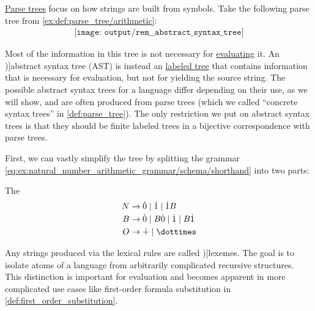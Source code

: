 \begin{concept}\label{con:abstract_syntax_tree}
  \hyperref[def:parse_tree]{Parse trees} focus on how strings are built from symbols. Take the following parse tree from \cref{ex:def:parse_tree/arithmetic}:
  \begin{equation}\label{eq:con:abstract_syntax_tree/base}
    \begin{aligned}
      \texttt{[image: output/rem\_\_abstract\_syntax\_tree]}
    \end{aligned}
  \end{equation}

  Most of the information in this tree is not necessary for \hyperref[con:evaluation]{evaluating} it. An \term[en=abstract syntax tree (\cite[41]{AhoEtAl2006Compilers})]{abstract syntax tree} (AST) is instead an \hyperref[def:labeled_tree]{labeled tree} that contains information that is necessary for evaluation, but not for yielding the source string. The possible abstract syntax trees for a language differ depending on their use, as we will show, and are often produced from parse trees (which we called \enquote{concrete syntax trees} in \cref{def:parse_tree}). The only restriction we put on abstract syntax trees is that they should be finite labeled trees in a bijective correspondence with parse trees.

  First, we can vastly simplify the tree by splitting the grammar \eqref{eq:ex:natural_number_arithmetic_grammar/schema/shorthand} into two parts:
  \begin{thmenum}
     The 
    \begin{equation*}
      \begin{aligned}
        N &\to \syn0 \mid \syn1 \mid \syn1 B \\
        B &\to \syn0 \mid B \syn0 \mid \syn1 \mid B \syn1 \\
        O &\to \synplus \mid \syntimes
      \end{aligned}
    \end{equation*}

    Any strings produced via the lexical rules are called \term[ru=лексемы (\cite[329]{Гладкий1973ГрамматикиИЯзыки})]{lexemes}. The goal is to isolate atoms of a language from arbitrarily complicated recursive structures. This distinction is important for evaluation and becomes apparent in more complicated use cases like first-order formula substitution in \cref{def:first_order_substitution}.


\end{thmenum}
\end{concept}
